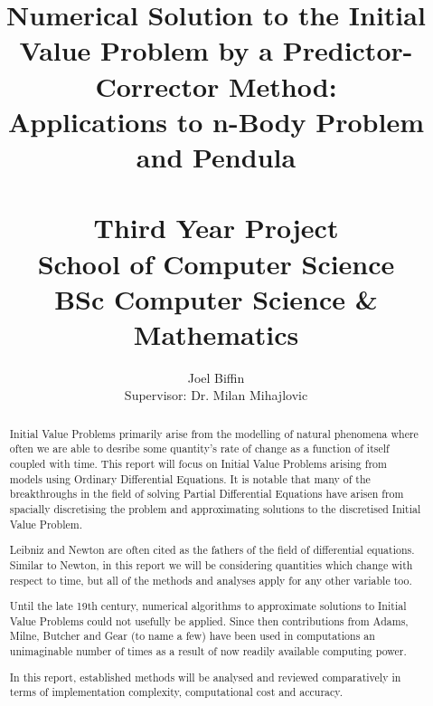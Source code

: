 \documentclass[12pt, twoside]{report}
\theoremstyle{plain}
\theoremstyle{definition}
\theoremstyle{definition}
\begin{document}

\title{
    \Large{Numerical Solution to the Initial Value Problem by a 
    Predictor-Corrector Method:}\\
    Applications to n-Body Problem and Pendula\\~\\Third Year Project\\School of Computer Science\\BSc Computer Science \& Mathematics}
\author{Joel Biffin \\ Supervisor: Dr. Milan Mihajlovic}
\maketitle


\tableofcontents


\begin{abstract}

    Initial Value Problems primarily arise from the modelling of natural
    phenomena where often we are able to desribe some quantity's rate of change
    as a function of itself coupled with time. This report will focus on
    Initial Value Problems arising from models using Ordinary Differential
    Equations. It is notable that many of the breakthroughs in the field of
    solving Partial Differential Equations have arisen from spacially
    discretising the problem and approximating solutions to the discretised
    Initial Value Problem.

    Leibniz and Newton are often cited as the fathers of the field of
    differential equations. Similar to Newton, in this report we will be
    considering quantities which change with respect to time, but all of the
    methods and analyses apply for any other variable too. 

    Until the late 19th century, numerical algorithms to approximate solutions
    to Initial Value Problems could not usefully be applied. Since then
    contributions from Adams, Milne, Butcher and Gear (to name a few) have been
    used in computations an unimaginable number of times as a result of now 
    readily available computing power. 

    In this report, established methods will be analysed and reviewed 
    comparatively in terms of implementation complexity, computational cost
    and accuracy.

\end{abstract}
\end{document}
